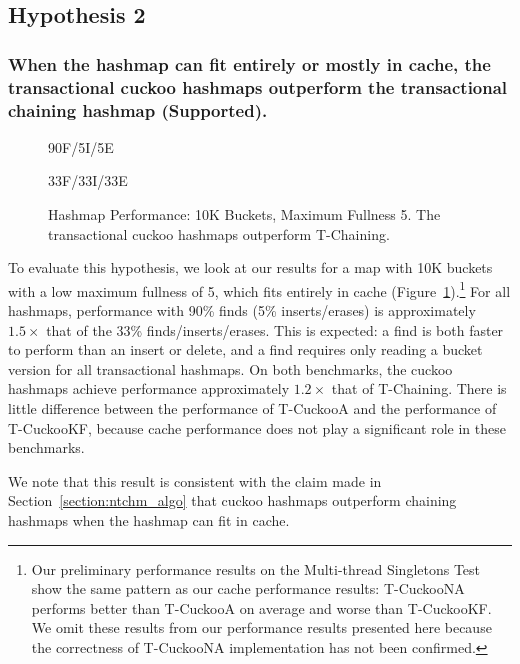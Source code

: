 \subsection{Hypothesis 2}
\subsubsection{When the hashmap can fit entirely or mostly in cache, the transactional cuckoo hashmaps outperform the transactional chaining hashmap (Supported).}

\begin{figure}[ht!]
    \centering
    \begin{minipage}{0.75\textwidth}
	\caption*{90F/5I/5E}
        \vspace{12pt}
    \end{minipage}
    \begin{minipage}{0.75\textwidth}
	\caption*{33F/33I/33E}
    \end{minipage}
    \caption[Hashmap Performance: 10K Buckets, Maximum Fullness 5]{Hashmap Performance: 10K Buckets, Maximum Fullness 5. The transactional cuckoo hashmaps outperform T-Chaining.}
    \label{fig:hm_5}
\end{figure}


To evaluate this hypothesis, we look at our results for a map with 10K buckets with a low maximum fullness of 5, which fits entirely in cache (Figure~\ref{fig:hm_5}).\footnote{Our preliminary performance results on the Multi-thread Singletons Test show the same pattern as our cache performance results: T-CuckooNA performs better than T-CuckooA on average and worse than T-CuckooKF. We omit these results from our performance results presented here because the correctness of T-CuckooNA implementation has not been confirmed.}
For all hashmaps, performance with 90\% finds (5\% inserts/erases) is approximately $1.5\times$ that of the 33\% finds/inserts/erases. This is expected: a find is both faster to perform than an insert or delete, and a find requires only reading a bucket version for all transactional hashmaps.
On both benchmarks, the cuckoo hashmaps achieve performance approximately $1.2\times$ that of T-Chaining. There is little difference between the performance of T-CuckooA and the performance of T-CuckooKF, because cache performance does not play a significant role in these benchmarks.

We note that this result is consistent with the claim made in Section~\ref{section:ntchm_algo} that cuckoo hashmaps outperform chaining hashmaps when the hashmap can fit in cache. 

